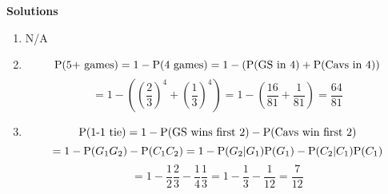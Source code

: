 \documentclass[12pt]{article}
\newcommand{\Pp}{\emph{\emph{P}}}
\begin{document}
\textbf{Solutions}
\begin{enumerate}
	\item N/A
	\item $$\Pp(\text{5+ games}) = 1 - \Pp(\text{4 games}) = 1 - (\Pp(\text{GS in 4}) + \Pp(\text{Cavs in 4}))$$ $$= 1 - ((\frac{2}{3})^4 + (\frac{1}{3})^4) = 1 - (\frac{16}{81} + \frac{1}{81}) = \frac{64}{81}$$
	\item $$\Pp(\text{1-1 tie}) = 1 - \Pp(\text{GS wins first 2}) - \Pp(\text{Cavs win first 2})$$ $$= 1 - \Pp(G_1 G_2) - \Pp(C_1 C_2) = 1 - \Pp(G_2 | G_1) \Pp(G_1) - \Pp(C_2 | C_1) \Pp(C_1)$$ $$= 1 - \frac{1}{2} \frac{2}{3} - \frac{1}{4} \frac{1}{3} = 1 - \frac{1}{3} - \frac{1}{12} = \frac{7}{12}$$
\end{enumerate}
\end{document}
